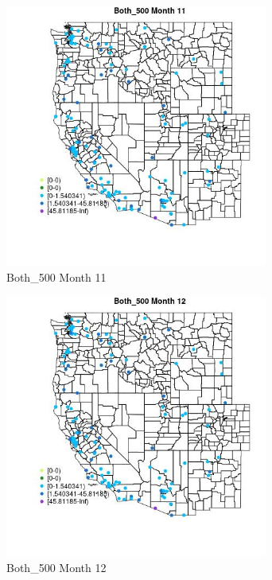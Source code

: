\begin{figure} 
\centering  
\includegraphics[width=0.77\textwidth]{Code_Outputs/Report_ML_input_PM25_Step4_part_e_de_duplicated_aves_MapObsMo11Both_500.jpg} 
\caption{\label{fig:Report_ML_input_PM25_Step4_part_e_de_duplicated_avesMapObsMo11Both_500}Both_500 Month 11} 
\end{figure} 
 

\clearpage 

\begin{figure} 
\centering  
\includegraphics[width=0.77\textwidth]{Code_Outputs/Report_ML_input_PM25_Step4_part_e_de_duplicated_aves_MapObsMo12Both_500.jpg} 
\caption{\label{fig:Report_ML_input_PM25_Step4_part_e_de_duplicated_avesMapObsMo12Both_500}Both_500 Month 12} 
\end{figure} 
 

